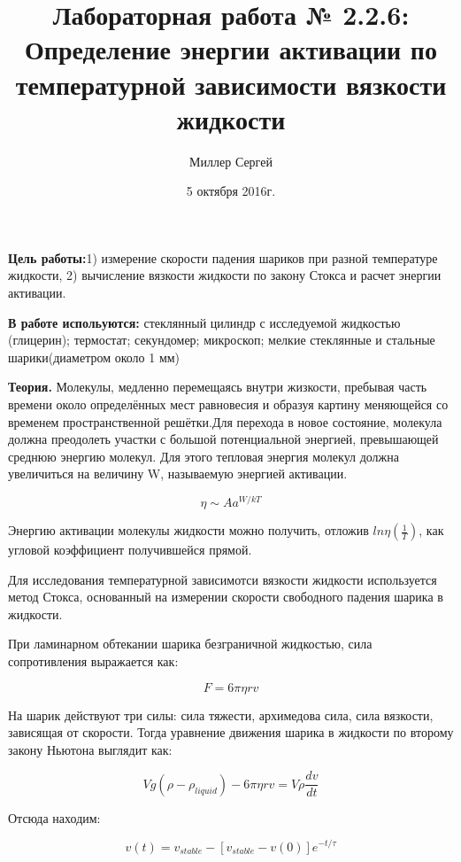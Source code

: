 \documentclass{article}
\title{Лабораторная работа № 2.2.6:
Определение энергии активации по температурной зависимости вязкости жидкости }
\author{Миллер Сергей}
\date{5 октября 2016г.}
\begin{document}
\maketitle
\textbf{Цель работы:}1) измерение скорости падения шариков при разной температуре жидкости, 2) вычисление вязкости жидкости по закону Стокса и расчет энергии активации.


\textbf{В работе испольуются:} стеклянный цилиндр с исследуемой жидкостью (глицерин); термостат; секундомер; микроскоп; мелкие стеклянные и стальные шарики(диаметром около 1 мм)

\textbf{Теория.}
Молекулы, медленно перемещаясь внутри жизкости, пребывая часть времени около определённых мест равновесия и образуя картину меняющейся со временем пространственной решётки.Для перехода в новое состояние, молекула должна преодолеть участки с большой потенциальной энергией, превышающей среднюю энергию молекул. Для этого тепловая энергия молекул должна увеличиться на величину W, называемую энергией активации.


\begin{equation}
    \eta \sim A a^{W/kT}
\end{equation}

Энергию активации молекулы жидкости можно получить, отложив $ln \eta (\frac{1}{T})$, как угловой коэффициент получившейся прямой.

Для исследования температурной зависимотси вязкости жидкости используется метод Стокса, основанный на измерении скорости свободного падения шарика в жидкости.

При ламинарном обтекании шарика безграничной жидкостью, сила сопротивления выражается как:

\begin{equation}
    F = 6 \pi \eta r v
\end{equation}

На шарик действуют три силы: сила тяжести, архимедова сила, сила вязкости, зависящая от скорости. Тогда уравнение движения шарика в жидкости по второму закону Ньютона выглядит как:

\begin{equation}
    V g (\rho - \rho_{liquid} ) - 6 \pi \eta r v = V \rho \frac{dv}{dt}
\end{equation}

Отсюда находим:

\begin{equation}
    v(t) = v_{stable} - [v_{stable} - v(0)] e^{-t/ \tau}
\end{equation}
\end{document}
